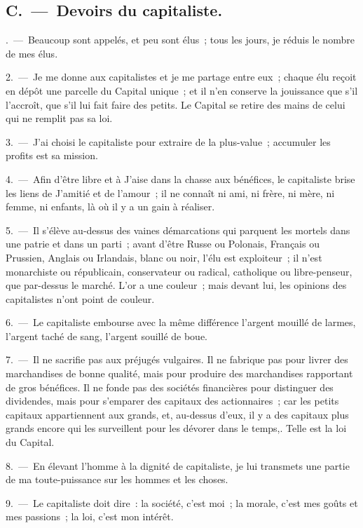 \documentclass[french,twoside]{book} %
\begin{document}
\subsection[{C. — Devoirs du capitaliste.}]{C. — Devoirs du capitaliste.}
. — Beaucoup sont appelés, et peu sont élus ; tous les jours, je réduis le nombre de mes élus.\par
2. — Je me donne aux capitalistes et je me partage entre eux ; chaque élu reçoit en dépôt une parcelle du Capital unique ; et il n’en conserve la jouissance que s’il l’accroît, que s’il lui fait faire des petits. Le Capital se retire des mains de celui qui ne remplit pas sa loi.\par
3. — J'ai choisi le capitaliste pour extraire de la plus-value ; accumuler les profits est sa mission.\par
4. — Afin d’être libre et à J'aise dans la chasse aux bénéfices, le capitaliste brise les liens de J'amitié et de l’amour ; il ne connaît ni ami, ni frère, ni mère, ni femme, ni enfants, là où il y a un gain à réaliser.\par
5. — Il s’élève au-dessus des vaines démarcations qui parquent les mortels dans une patrie et dans un parti ; avant d’être Russe ou Polonais, Français ou Prussien, Anglais ou Irlandais, blanc ou noir, l’élu est exploiteur ; il n’est monarchiste ou républicain, conservateur ou radical, catholique ou libre-penseur, que par-dessus le marché. L'or a une couleur ; mais devant lui, les opinions des capitalistes n’ont point de couleur.\par
6. — Le capitaliste embourse avec la même différence l’argent mouillé de larmes, l’argent taché de sang, l’argent souillé de boue.\par
7. — Il ne sacrifie pas aux préjugés vulgaires. Il ne fabrique pas pour livrer des marchandises de bonne qualité, mais pour produire des marchandises rapportant de gros bénéfices. Il ne fonde pas des sociétés financières pour distinguer des dividendes, mais pour s’emparer des capitaux des actionnaires ; car les petits capitaux appartiennent aux grands, et, au-dessus d’eux, il y a des capitaux plus grands encore qui les surveillent pour les dévorer dans le temps,. Telle est la loi du Capital.\par
8. — En élevant l’homme à la dignité de capitaliste, je lui transmets une partie de ma toute-puissance sur les hommes et les choses.\par
9. — Le capitaliste doit dire : la société, c’est moi ; la morale, c’est mes goûts et mes passions ; la loi, c’est mon intérêt.\par
\end{document}
